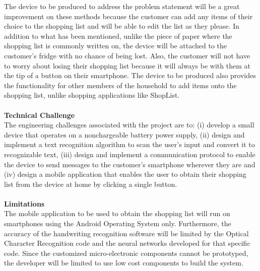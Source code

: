 {The device to be produced to address the problem statement will be a great improvement on these methods because the customer can add any items of their choice to the shopping list and will be able to edit the list as they please. In addition to what has been mentioned, unlike the piece of paper where the shopping list is commonly  written on, the device will be attached to the customer's fridge with no chance of being lost. Also, the customer will not have to worry about losing their shopping list because it will always be with them at the tip of a button on their smartphone. The device to be produced also provides the functionality for other members of the household to add items onto the shopping list, unlike shopping applications like ShopList\cite{ShopL}.
\noindent
\\\\
\textbf{Technical Challenge} \\
The engineering challenges associated with the project are to: (i) develop a small device that operates on a nonchargeable battery power supply, (ii) design and implement a text recognition algorithm to scan the user's input and convert it to recognizable text, (iii) design and implement a communication protocol to enable the device to send messages to the customer's smartphone wherever they are and (iv) design a mobile application that enables the user to obtain their shopping list from the device at home by clicking a single button. \\\\
\noindent
\textbf{Limitations}\\
The mobile application to be used to obtain the shopping list will run on smartphones using the Android Operating System only. Furthermore, the accuracy of the handwriting recognition software will be limited by the Optical Character Recognition code and the neural networks developed for that specific code. Since the customized micro-electronic components cannot be prototyped, the developer will be limited to use low cost components to build the system.
\nocite{Haykin:Communication_Systems}



}
